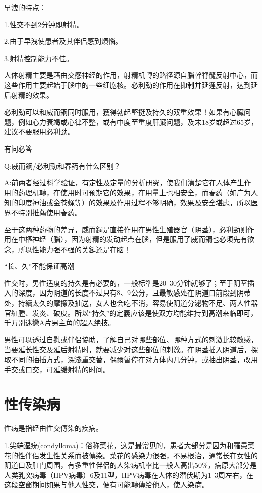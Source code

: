 \documentclass[12pt,UTF8]{ctexbook}
\begin{document}
早洩的特点：

1.性交不到2分钟即射精。

2.由于早洩使患者及其伴侣感到煩惱。

3.射精控制能力不佳。

人体射精主要是藉由交感神经的作用，射精机轉的路径源自腦幹脊髓反射中心，而这些作用主要起始于腦中的一些细胞核。必利劲的作用在抑制并延遲反射，达到延后射精的效果。

必利劲可以和威而鋼同时服用，獲得勃起堅挺及持久的双重效果！如果有心臓问题，例如心力衰竭或心律不整，或有中度至重度肝臟问题，及未18岁或超过65岁，建议不要服用必利劲。

有问必答

Q:威而鋼/必利勁和春药有什么区别？

A:前两者经过科学验证，有定性及定量的分析研究，使我们清楚它在人体产生作用的药理机轉，在使用时可预期它的效果，在用量上也相安全，而春药（如广为人知的印度神油或金苍蝇等）的效果及作用过程不够明确，效果及安全堪虑，所以医界不特别推薦使用春药。

至于这两种药物的差异，威而鋼是直接作用在男性生殖器官（阴茎），必利勁则作用在中樞神经（腦），因为射精的发动起点在腦，但是服用了威而鋼也必须先有欲念，所以性能力强不强的关鍵还是在脑！

“长、久”不能保证高潮

性交时，男性适度的持久是有必要的，一般标準是20~30分钟就够了；至于阴茎插入的深度，因为阴道的长度不过只有8、9公分，且最敏感处在阴道口前段到阴蒂处，持續太久的摩擦及抽送，女人也会吃不消，容易使阴道分泌物不足、两人性器官紅腫、发炎、破皮。所以“持久”的定義应该是使双方均能维持到高潮来临即可，千万别迷戀A片男主角的超人绝技。

男性可以透过自慰或伴侣協助，了解自己对哪些部位、哪种方式的刺激比较敏感，当要延长性交及延后射精时，就要减少对这些部位的刺激。在阴茎插入阴道后，探取不同的抽插方式，深淺重交替，偶爾暂停在对方体内几分钟，或抽出阴茎，改用手交或口交，可延缓射精的时间。

\part{性传染病}

性病是指经由性交傳染的疾病。

1.尖端湿疣(condylloma)：俗称菜花，这是最常见的，患者大部分是因为和罹患菜花的性伴侣发生性关系而被傳染。菜花的感染力很强，不易根治，通常长在女性的阴道口及肛门周围，有多重性伴侣的人染病机率比一般人高出50\%，病原大部分是人类乳突病毒（HPV病毒）6及11型，HPV病毒在人体的潜伏期为1~3周左右，在这段空窗期间如果与他人性交，便有可能轉傳给他人，使人染病。
\end{document}
